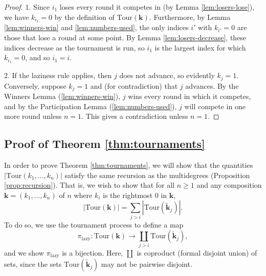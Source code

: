 \documentclass[11pt]{amsart}
\newcommand{\Tour}{\mathrm{Tour}}
\newcommand{\forget}{\pi_{\mathrm{lazy}}}
\numberwithin{thm}{section}
\numberwithin{equation}{section}
\numberwithin{figure}{section}
\theoremstyle{definition}
\begin{document}
\begin{proof}
  1. Since $i_1$ loses every round it competes in (by Lemma \ref{lem:losers-lose}), we have $k_{i_1}=0$ by the definition of $\Tour(\mathbf{k})$.  Furthermore, by Lemma \ref{lem:winners-win} and \ref{lem:numbers-used}, the only indices $i'$ with $k_{i'}=0$ are those that lose a round at some point.  By Lemma \ref{lem:losers-decrease}, these indices decrease as the tournament is run, so $i_1$ is the largest index for which $k_{i_1}=0$, and so $i_1=i$. 
  
  2. If the laziness rule applies, then $j$ does not advance, so evidently $k_j = 1$. Conversely, suppose $k_j = 1$ and (for contradiction) that $j$ advances. By the Winners Lemma (\ref{lem:winners-win}), $j$ wins every round in which it competes, and by the Participation Lemma (\ref{lem:numbers-used}), $j$ will compete in one more round unless $n=1$. This gives a contradiction unless $n=1$.
\end{proof}

\subsection{Proof of Theorem \ref{thm:tournaments}}

In order to prove Theorem \ref{thm:tournaments}, we will show that the quantities $|\Tour(k_1,\ldots,k_n)|$ satisfy the same recursion as the multidegrees (Proposition \ref{prop:recursion}).  That is, we wish to show that for all $n\ge 1$ and any composition $\mathbf{k}=(k_1,\ldots,k_n)$ of $n$ where $k_i$ is the rightmost $0$ in $\mathbf{k}$, $$|\Tour(\mathbf{k})|=\sum_{j>i} |\Tour(\widetilde{\mathbf{k}}_j)|.$$
To do so, we use the tournament process to define a map $$\forget:\Tour(\mathbf{k})\to \coprod_{j>i} \Tour(\widetilde{\mathbf{k}}_j),$$ and we show $\forget$ is a bijection. Here, $\coprod$ is coproduct (formal disjoint union) of sets, since the sets $\Tour(\widetilde{\mathbf{k}}_j)$ may not be pairwise disjoint.
\end{document}
